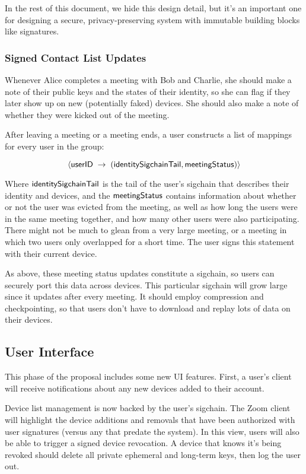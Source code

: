In the rest of this document, we hide this design detail, but it's an important one for designing a secure, privacy-preserving system with immutable building blocks like signatures.

\subsubsection{Signed Contact List Updates}

Whenever Alice completes a meeting with Bob and Charlie, she should make a note of their public keys and the states of their identity, so she can flag if they later show up on new (potentially faked) devices. She should also make a note of whether they were kicked out of the meeting.

After leaving a meeting or a meeting ends, a user constructs a list of mappings for every user in the group:

\[
\langle \mathsf{userID} \; \rightarrow \; ( \mathsf{identitySigchainTail}, \mathsf{meetingStatus} ) \rangle
\]

Where $\mathsf{identitySigchainTail}$ is the tail of the user's sigchain that describes their identity and devices, and the $\mathsf{meetingStatus}$ contains  information about whether or not the user was evicted from the meeting, as well as how long the users were in the same meeting together, and how many other users were also participating. There might not be much to glean from a very large meeting, or a meeting in which two users only overlapped for a short time. The user signs this statement with their current device.

As above, these meeting status updates constitute a sigchain, so users can securely port this data across devices. This particular sigchain will grow large since it updates after every meeting. It should employ compression and checkpointing, so that users don't have to download and replay lots of data on their devices.

\subsection{User Interface}

This phase of the proposal includes some new UI features. First, a user's client will receive notifications about any new devices added to their account.

Device list management is now backed by the user's sigchain. The Zoom client will highlight the device additions and removals that have been authorized with user signatures (versus any that predate the system). In this view, users will also be able to trigger a signed device revocation. A device that knows it's being revoked should delete all private ephemeral and long-term keys, then log the user out.


